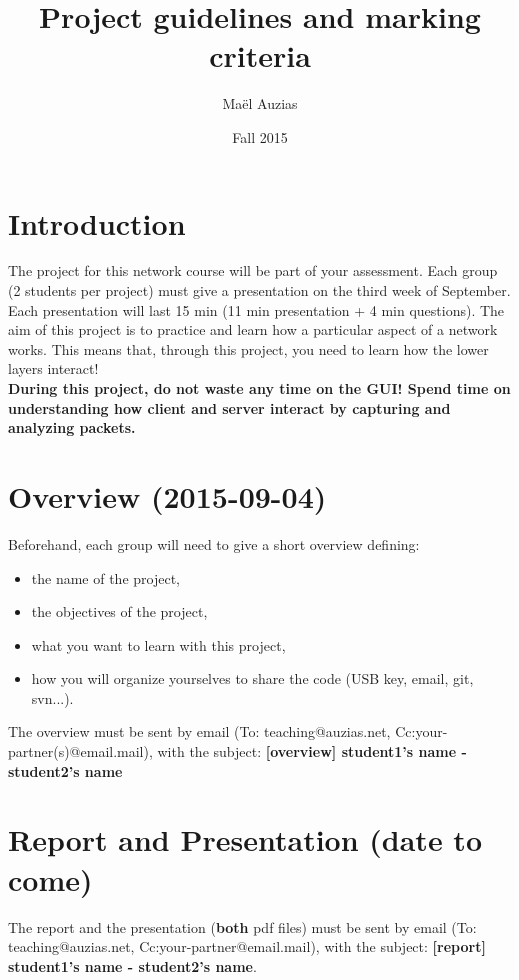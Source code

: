\documentclass[11pt]{article}
\begin{document}
 
\title{Project guidelines and marking criteria}
\date{Fall 2015}
\author{Maël Auzias}
\maketitle

\section{Introduction}
The project for this network course will be part of your assessment. Each group (2 students per project) must give a presentation on the third week of September. Each presentation will last 15 min (11 min presentation + 4 min questions). The aim of this project is to practice and learn how a particular aspect of a network works. This means that, through this project, you need to learn how the lower layers interact!\\
\textbf{During this project, do not waste any time on the GUI! Spend time on understanding how client and server interact by capturing and analyzing packets.}

\section{Overview (2015-09-04)}
Beforehand, each group will need to give a short overview defining:
  \begin{itemize}
    \item the name of the project,
    \item the objectives of the project,
    \item what you want to learn with this project,
    \item how you will organize yourselves to share the code (USB key, email, git, svn...).
  \end{itemize}
The overview must be sent by email (To: teaching@auzias.net, Cc:your-partner(s)@email.mail), with the subject: \textbf{[overview] student1's name - student2's name}

\section{Report and Presentation (date to come)}
The report and the presentation (\textbf{both} pdf files) must be sent by email (To: teaching@auzias.net, Cc:your-partner@email.mail), with the subject: \textbf{[report] student1's name - student2's name}.
\end{document}
